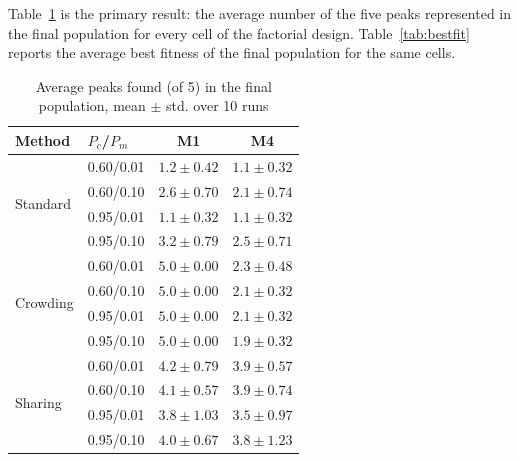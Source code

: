 \documentclass[conference]{IEEEtran}
\begin{document}
Table~\ref{tab:peaks} is the primary result: the average number of the five
peaks represented in the final population for every cell of the factorial
design. Table~\ref{tab:bestfit} reports the average best fitness of the final
population for the same cells.

\begin{table}[htbp]
\caption{Average peaks found (of 5) in the final population, mean $\pm$ std.
over 10 runs}
\label{tab:peaks}
\centering
\footnotesize
\begin{tabular}{@{}llcc@{}}
\toprule
Method & $P_c$/$P_m$ & M1 & M4 \\
\midrule
\multirow{4}{*}{Standard} & 0.60/0.01 & $1.2 \pm 0.42$ & $1.1 \pm 0.32$ \\
 & 0.60/0.10 & $2.6 \pm 0.70$ & $2.1 \pm 0.74$ \\
 & 0.95/0.01 & $1.1 \pm 0.32$ & $1.1 \pm 0.32$ \\
 & 0.95/0.10 & $3.2 \pm 0.79$ & $2.5 \pm 0.71$ \\
\midrule
\multirow{4}{*}{Crowding} & 0.60/0.01 & $5.0 \pm 0.00$ & $2.3 \pm 0.48$ \\
 & 0.60/0.10 & $5.0 \pm 0.00$ & $2.1 \pm 0.32$ \\
 & 0.95/0.01 & $5.0 \pm 0.00$ & $2.1 \pm 0.32$ \\
 & 0.95/0.10 & $5.0 \pm 0.00$ & $1.9 \pm 0.32$ \\
\midrule
\multirow{4}{*}{Sharing} & 0.60/0.01 & $4.2 \pm 0.79$ & $3.9 \pm 0.57$ \\
 & 0.60/0.10 & $4.1 \pm 0.57$ & $3.9 \pm 0.74$ \\
 & 0.95/0.01 & $3.8 \pm 1.03$ & $3.5 \pm 0.97$ \\
 & 0.95/0.10 & $4.0 \pm 0.67$ & $3.8 \pm 1.23$ \\
\bottomrule
\end{tabular}
\end{table}
\end{document}
